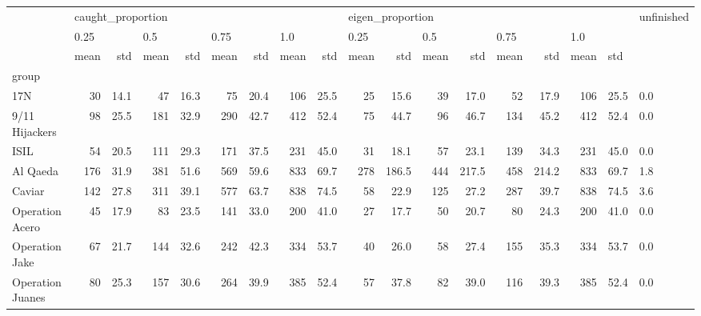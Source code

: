 \begin{tabular}{lrrrrrrrrrrrrrrrrl}
\toprule
{} & \multicolumn{8}{l}{caught\_proportion} & \multicolumn{8}{l}{eigen\_proportion} & unfinished \\
{} & \multicolumn{2}{l}{0.25} & \multicolumn{2}{l}{0.5} & \multicolumn{2}{l}{0.75} & \multicolumn{2}{l}{1.0} & \multicolumn{2}{l}{0.25} & \multicolumn{2}{l}{0.5} & \multicolumn{2}{l}{0.75} & \multicolumn{3}{l}{1.0} \\
{} &              mean &   std & mean &   std & mean &   std & mean &   std &             mean &    std & mean &    std & mean &    std & mean & \multicolumn{2}{l}{std} \\
group                &                   &       &      &       &      &       &      &       &                  &        &      &        &      &        &      &       &            \\
\midrule
17N                  &                30 &  14.1 &   47 &  16.3 &   75 &  20.4 &  106 &  25.5 &               25 &   15.6 &   39 &   17.0 &   52 &   17.9 &  106 &  25.5 &        0.0 \\
9/11 Hijackers       &                98 &  25.5 &  181 &  32.9 &  290 &  42.7 &  412 &  52.4 &               75 &   44.7 &   96 &   46.7 &  134 &   45.2 &  412 &  52.4 &        0.0 \\
ISIL                 &                54 &  20.5 &  111 &  29.3 &  171 &  37.5 &  231 &  45.0 &               31 &   18.1 &   57 &   23.1 &  139 &   34.3 &  231 &  45.0 &        0.0 \\
Al Qaeda             &               176 &  31.9 &  381 &  51.6 &  569 &  59.6 &  833 &  69.7 &              278 &  186.5 &  444 &  217.5 &  458 &  214.2 &  833 &  69.7 &        1.8 \\
Caviar               &               142 &  27.8 &  311 &  39.1 &  577 &  63.7 &  838 &  74.5 &               58 &   22.9 &  125 &   27.2 &  287 &   39.7 &  838 &  74.5 &        3.6 \\
Operation Acero      &                45 &  17.9 &   83 &  23.5 &  141 &  33.0 &  200 &  41.0 &               27 &   17.7 &   50 &   20.7 &   80 &   24.3 &  200 &  41.0 &        0.0 \\
Operation Jake       &                67 &  21.7 &  144 &  32.6 &  242 &  42.3 &  334 &  53.7 &               40 &   26.0 &   58 &   27.4 &  155 &   35.3 &  334 &  53.7 &        0.0 \\
Operation Juanes     &                80 &  25.3 &  157 &  30.6 &  264 &  39.9 &  385 &  52.4 &               57 &   37.8 &   82 &   39.0 &  116 &   39.3 &  385 &  52.4 &        0.0 \\

\end{tabular}
